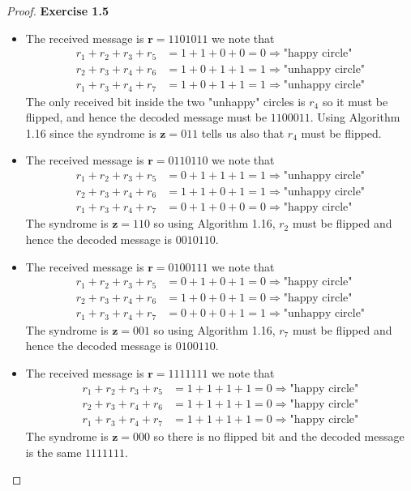 \documentclass[11pt]{article}
\theoremstyle{definition}
\begin{document}
\cleardoublepage
\begin{proof}{\textbf{Exercise 1.5}}\\
\begin{itemize}
\item [(a)] The received message is $\bm{r} = 1101011$ we note that
\begin{align*}
    r_1 + r_2 + r_3 + r_5 &= 1 + 1 + 0 + 0 = 0 \Rightarrow \text{"happy circle"}\\
    r_2 + r_3 + r_4 + r_6 &= 1 + 0 + 1 + 1 = 1 \Rightarrow \text{"unhappy circle"}\\
    r_1 + r_3 + r_4 + r_7 &= 1 + 0 + 1 + 1 = 1 \Rightarrow \text{"unhappy circle"}
\end{align*}
The only received bit inside the two "unhappy" circles is $r_4$ so it must be
flipped, and hence the decoded message must be  $1100011$.
Using Algorithm 1.16 since the syndrome is $\bm{z} = 011$ tells us also that
$r_4$ must be flipped.
\item [(b)] The received message is $\bm{r} = 0110110$ we note that
\begin{align*}
    r_1 + r_2 + r_3 + r_5 &= 0 + 1 + 1 + 1 = 1 \Rightarrow \text{"unhappy circle"}\\
    r_2 + r_3 + r_4 + r_6 &= 1 + 1 + 0 + 1 = 1 \Rightarrow \text{"unhappy circle"}\\
    r_1 + r_3 + r_4 + r_7 &= 0 + 1 + 0 + 0 = 0 \Rightarrow \text{"happy circle"}
\end{align*}
The syndrome is $\bm{z} = 110$ so using Algorithm 1.16, $r_2$ must be flipped 
and hence the decoded message is $0010110$.
\item [(c)] The received message is $\bm{r} = 0100111$ we note that
\begin{align*}
    r_1 + r_2 + r_3 + r_5 &= 0 + 1 + 0 + 1 = 0 \Rightarrow \text{"happy circle"}\\
    r_2 + r_3 + r_4 + r_6 &= 1 + 0 + 0 + 1 = 0 \Rightarrow \text{"happy circle"}\\
    r_1 + r_3 + r_4 + r_7 &= 0 + 0 + 0 + 1 = 1 \Rightarrow \text{"unhappy circle"}
\end{align*}
The syndrome is $\bm{z} = 001$ so using Algorithm 1.16, $r_7$ must be flipped 
and hence the decoded message is $0100110$.
\item [(d)] The received message is $\bm{r} = 1111111$ we note that
\begin{align*}
    r_1 + r_2 + r_3 + r_5 &= 1 + 1 + 1 + 1 = 0 \Rightarrow \text{"happy circle"}\\
    r_2 + r_3 + r_4 + r_6 &= 1 + 1 + 1 + 1 = 0 \Rightarrow \text{"happy circle"}\\
    r_1 + r_3 + r_4 + r_7 &= 1 + 1 + 1 + 1 = 0 \Rightarrow \text{"happy circle"}
\end{align*}
The syndrome is $\bm{z} = 000$ so there is no flipped bit and the decoded
message is the same $1111111$.
\end{itemize}
\end{proof}
\end{document}
